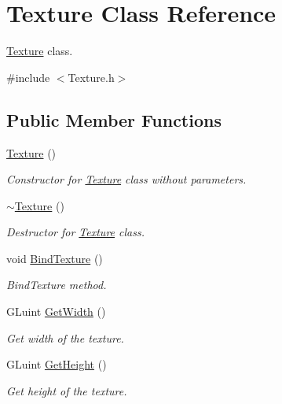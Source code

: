 \hypertarget{class_texture}{}\section{Texture Class Reference}
\label{class_texture}


\mbox{\hyperlink{class_texture}{Texture}} class.  




{\ttfamily \#include $<$Texture.\+h$>$}

\subsection*{Public Member Functions}
\begin{DoxyCompactItemize}
\item 
\mbox{\hyperlink{class_texture_a6c275e3f186675ff6ed73ccf970e552f}{Texture}} ()
\begin{DoxyCompactList}\small\item\em Constructor for \mbox{\hyperlink{class_texture}{Texture}} class without parameters. \end{DoxyCompactList}\item 
\mbox{\hyperlink{class_texture_a09c4bcb7462f64c1d20fa69dba3cee8a}{$\sim$\+Texture}} ()
\begin{DoxyCompactList}\small\item\em Destructor for \mbox{\hyperlink{class_texture}{Texture}} class. \end{DoxyCompactList}\item 
void \mbox{\hyperlink{class_texture_a23465d14b76deef9cf22c14a97040f52}{Bind\+Texture}} ()
\begin{DoxyCompactList}\small\item\em Bind\+Texture method. \end{DoxyCompactList}\item 
G\+Luint \mbox{\hyperlink{class_texture_af1186a3204c49bf2a8cd09550299b0c9}{Get\+Width}} ()
\begin{DoxyCompactList}\small\item\em Get width of the texture. \end{DoxyCompactList}\item 
G\+Luint \mbox{\hyperlink{class_texture_a9313d6712c3af10b467db3b7c3d5a230}{Get\+Height}} ()
\begin{DoxyCompactList}\small\item\em Get height of the texture. \end{DoxyCompactList}\item 

\end{DoxyCompactItemize}
